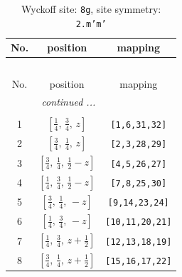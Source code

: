 \documentclass[fleqn,8pt]{jsarticle}
\begin{document}
\begin{longtable}{ccc}
\caption{Wyckoff site: {\tt 8g}, site symmetry: {\tt 2.m'm'}}
 \\
 \hline \hline
No. & position & mapping \\ \hline \endfirsthead

\multicolumn{2}{l}{\tablename\ \thetable{}} \\
 \hline \hline
No. & position & mapping \\ \hline \endhead

 \hline \hline
\multicolumn{2}{r}{\footnotesize\it continued ...} \\ \endfoot

 \hline \hline
\multicolumn{2}{r}{} \\ \endlastfoot

1 & $\left[ \frac{1}{4},\, \frac{3}{4},\, z \right]$ & {\tt [1,6,31,32]} \\ \hline
2 & $\left[ \frac{3}{4},\, \frac{1}{4},\, z \right]$ & {\tt [2,3,28,29]} \\ \hline
3 & $\left[ \frac{3}{4},\, \frac{1}{4},\, \frac{1}{2} - z \right]$ & {\tt [4,5,26,27]} \\ \hline
4 & $\left[ \frac{1}{4},\, \frac{3}{4},\, \frac{1}{2} - z \right]$ & {\tt [7,8,25,30]} \\ \hline
5 & $\left[ \frac{3}{4},\, \frac{1}{4},\, - z \right]$ & {\tt [9,14,23,24]} \\ \hline
6 & $\left[ \frac{1}{4},\, \frac{3}{4},\, - z \right]$ & {\tt [10,11,20,21]} \\ \hline
7 & $\left[ \frac{1}{4},\, \frac{3}{4},\, z + \frac{1}{2} \right]$ & {\tt [12,13,18,19]} \\ \hline
8 & $\left[ \frac{3}{4},\, \frac{1}{4},\, z + \frac{1}{2} \right]$ & {\tt [15,16,17,22]} \\
\end{longtable}
\renewcommand{\arraystretch}{1.2}
\end{document}
